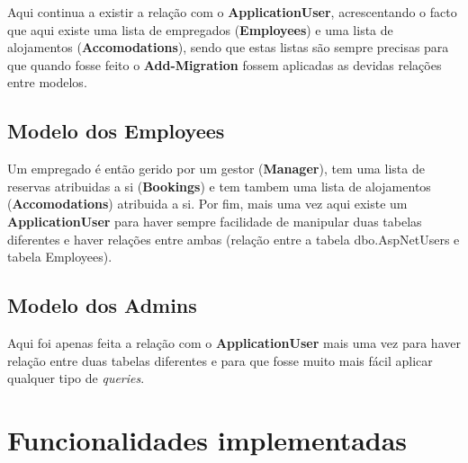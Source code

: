 \documentclass[11pt]{article}
\begin{document}
    Aqui continua a existir a relação com o \textbf{ApplicationUser}, acrescentando o facto que aqui existe uma lista de empregados (\textbf{Employees}) e uma lista de alojamentos (\textbf{Accomodations}), sendo que estas listas são sempre precisas para que quando fosse feito o \textbf{Add-Migration} fossem aplicadas as devidas relações entre modelos. 
    
    
    \subsection{Modelo dos Employees}
    \normalsize
    
    Um empregado é então gerido por um gestor (\textbf{Manager}), tem uma lista de reservas atribuidas a si (\textbf{Bookings}) e tem tambem uma lista de alojamentos (\textbf{Accomodations}) atribuida a si. Por fim, mais uma vez aqui existe um \textbf{ApplicationUser} para haver sempre facilidade de manipular duas tabelas diferentes e haver relações entre ambas (relação entre a tabela dbo.AspNetUsers e tabela Employees).
    
    
    \subsection{Modelo dos Admins}
    \normalsize
    
    Aqui foi apenas feita a relação com o \textbf{ApplicationUser} mais uma vez para haver relação entre duas tabelas diferentes e para que fosse muito mais fácil aplicar qualquer tipo de \emph{queries}.
    
    
    \large
    \section{Funcionalidades implementadas}
    \normalsize
    
\end{document}

